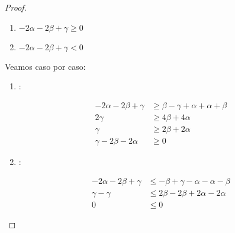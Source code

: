 \begin{proof}
    \begin{enumerate}
      \item $-2\alpha-2\beta+\gamma \geq 0$
      \item $-2\alpha-2\beta+\gamma < 0$
    \end{enumerate}
    Veamos caso por caso:
    \begin{enumerate}
      \item {}:

        \begin{equation*}
          \begin{aligned}
          -2\alpha-2\beta+\gamma &\geq \beta - \gamma + \alpha + \alpha + \beta \\
           2\gamma &\geq 4\beta + 4\alpha \\
           \gamma &\geq 2\beta + 2\alpha \\
           \gamma - 2\beta - 2\alpha& \geq 0
          \end{aligned}
        \end{equation*}

      \item {}:

        \begin{equation*}
          \begin{aligned}
           -2\alpha-2\beta+\gamma &\leq -\beta+\gamma-\alpha-\alpha-\beta \\
           \gamma - \gamma &\leq 2\beta - 2\beta + 2\alpha - 2\alpha \\
           0 &\leq 0
          \end{aligned}
        \end{equation*}


    \end{enumerate}


  \end{proof}

